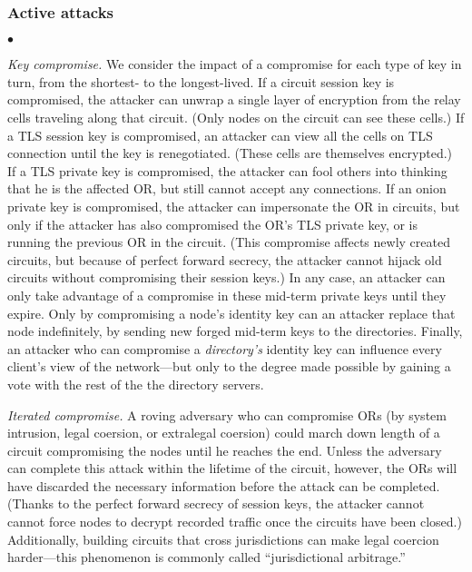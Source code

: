 \documentclass[times,10pt,twocolumn]{article}
\newenvironment{tightlist}{\begin{list}{$\bullet$}{
  \setlength{\itemsep}{0mm}
    \setlength{\parsep}{0mm}
    }}{\end{list}}
\begin{document}
\subsubsection*{Active attacks}
\begin{tightlist}
\item \emph{Key compromise.}  We consider the impact of a compromise
  for each type of key in turn, from the shortest- to the
  longest-lived.  If a circuit session key is compromised, the
  attacker can unwrap a single layer of encryption from the relay
  cells traveling along that circuit.  (Only nodes on the circuit can
  see these cells.)  If a TLS session key is compromised, an attacker
  can view all the cells on TLS connection until the key is
  renegotiated.  (These cells are themselves encrypted.)  If a TLS
  private key is compromised, the attacker can fool others into
  thinking that he is the affected OR, but still cannot accept any
  connections.  If an onion private key is compromised, the attacker
  can impersonate the OR in circuits, but only if the attacker has
  also compromised the OR's TLS private key, or is running the
  previous OR in the circuit.  (This compromise affects newly created
  circuits, but because of perfect forward secrecy, the attacker
  cannot hijack old circuits without compromising their session keys.)
  In any case, an attacker can only take advantage of a compromise in
  these mid-term private keys until they expire.  Only by
  compromising a node's identity key can an attacker replace that
  node indefinitely, by sending new forged mid-term keys to the
  directories.  Finally, an attacker who can compromise a
  \emph{directory's} identity key can influence every client's view
  of the network---but only to the degree made possible by gaining a
  vote with the rest of the the directory servers.

\item \emph{Iterated compromise.} A roving adversary who can
  compromise ORs (by system intrusion, legal coersion, or extralegal
  coersion) could march down length of a circuit compromising the
  nodes until he reaches the end.  Unless the adversary can complete
  this attack within the lifetime of the circuit, however, the ORs
  will have discarded the necessary information before the attack can
  be completed.  (Thanks to the perfect forward secrecy of session
  keys, the attacker cannot cannot force nodes to decrypt recorded
  traffic once the circuits have been closed.)  Additionally, building
  circuits that cross jurisdictions can make legal coercion
  harder---this phenomenon is commonly called ``jurisdictional
  arbitrage.''


\end{tightlist}
\end{document}

